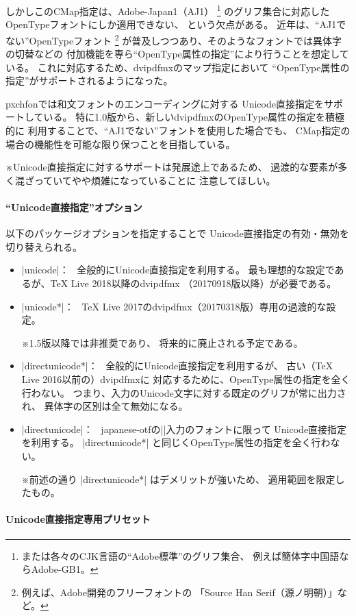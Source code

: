 \documentclass[uplatex,dvipdfmx,a4paper]{jsarticle}
\newcommand{\Pkg}[1]{\textsf{#1}}
\newcommand{\Note}{\par\noindent ※}
\newcommand{\Means}{：\ }
\providecommand{\Strong}[1]{\textsf{#1}}
\begin{document}
しかしこのCMap指定は、Adobe-Japan1（AJ1）%
\footnote{または各々のCJK言語の“Adobe標準”のグリフ集合、
例えば簡体字中国語ならAdobe-GB1。}%
のグリフ集合に対応したOpenTypeフォントにしか適用できない、
という欠点がある。
近年は、“AJ1でない”OpenTypeフォント
\footnote{例えば、Adobe開発のフリーフォントの
「Source Han Serif（源ノ明朝）」など。}%
が普及しつつあり、そのようなフォントでは異体字の切替などの
付加機能を専ら“OpenType属性の指定”により行うことを想定している。
これに対応するため、dvipdfmxのマップ指定において
“OpenType属性の指定”がサポートされるようになった。

\Pkg{pxchfon}では和文フォントのエンコーディングに対する
Unicode直接指定をサポートしている。
特に1.0版から、新しいdvipdfmxのOpenType属性の指定を積極的に
利用することで、“AJ1でない”フォントを使用した場合でも、
CMap指定の場合の機能性を可能な限り保つことを目指している。

\Note Unicode直接指定に対するサポートは発展途上であるため、
過渡的な要素が多く混ざっていてやや煩雑になっていることに
注意してほしい。

\paragraph{“Unicode直接指定”オプション}
以下のパッケージオプションを指定することで
Unicode直接指定の有効・無効を切り替えられる。

\begin{itemize}
\item |unicode|\Means
  全般的にUnicode直接指定を利用する。
  最も理想的な設定であるが、\Strong{{\TeX} Live 2018以降のdvipdfmx}%
  （20170918版以降）が必要である。
\item |unicode*|\Means
  {\TeX} Live 2017のdvipdfmx（20170318版）専用の\Strong{過渡的}な設定。
  \Note 1.5版以降では\Strong{非推奨}であり、
  将来的に廃止される予定である。
\item |directunicode*|\Means
  全般的にUnicode直接指定を利用するが、
  古い（{\TeX} Live 2016以前の）dvipdfmxに
  対応するために、OpenType属性の指定を全く行わない。
  つまり、入力のUnicode文字に対する既定のグリフが常に出力され、
  異体字の区別は全て無効になる。
\item |directunicode|\Means
  \Pkg{japanese-otf}の|\UTF|入力のフォントに限って
  Unicode直接指定を利用する。
  |directunicode*| と同じくOpenType属性の指定を全く行わない。
  \Note 前述の通り |directunicode*| はデメリットが強いため、
  適用範囲を限定したもの。
\end{itemize}

\paragraph{Unicode直接指定専用プリセット}
\end{document}
